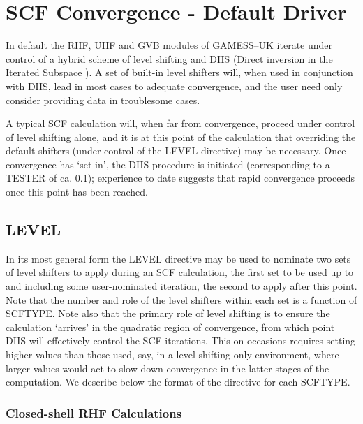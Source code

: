 \documentclass[11pt,fleqn]{article}
\begin{document}
\section[SCF Convergence - Default]{SCF Convergence - Default Driver}

In default the RHF, UHF and GVB modules of GAMESS--UK iterate under
control of a hybrid scheme of level shifting \cite{saunders} and DIIS
(Direct inversion in the Iterated Subspace \cite{pulay}). A set of
built-in level shifters will, when used in conjunction with DIIS, lead
in most cases to adequate convergence, and the user need only consider
providing data in troublesome cases.

A typical SCF calculation will, when far from convergence, proceed
under control of level shifting alone, and it is at this
point of the calculation that overriding the default shifters (under
control of the LEVEL directive) may be necessary. Once convergence
has `set-in', the DIIS procedure is initiated (corresponding to
a TESTER of ca. 0.1); experience to date suggests that rapid
convergence proceeds once this point has been reached.

\subsection[LEVEL]{LEVEL}

In its most general form the LEVEL directive may be used to nominate
two sets of level shifters to apply during an SCF calculation, the
first set to be used up to and including some user-nominated iteration,
the second to apply after this point. Note that the number and role of
the level shifters within each set is a function of SCFTYPE.  Note also
that the primary role of level shifting is to ensure the calculation
`arrives' in the quadratic region of convergence, from which point DIIS
will effectively control the SCF iterations.  This on occasions
requires setting higher values than those used, say, in a
level-shifting only environment, where larger values would act to slow
down convergence in the latter stages of the computation.  We describe
below the format of the directive for each SCFTYPE.

\subsubsection{Closed-shell RHF Calculations} 
\end{document}
